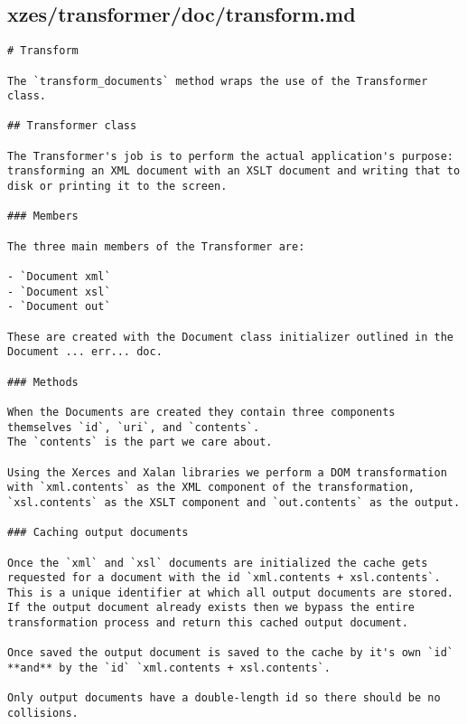 \subsection{xzes/transformer/doc/transform.md}
\begin{lstlisting}[caption={Documentation about the transformation code.}]
# Transform

The `transform_documents` method wraps the use of the Transformer class.

## Transformer class

The Transformer's job is to perform the actual application's purpose: transforming an XML document with an XSLT document and writing that to disk or printing it to the screen.

### Members

The three main members of the Transformer are:

- `Document xml`
- `Document xsl`
- `Document out`

These are created with the Document class initializer outlined in the Document ... err... doc.

### Methods

When the Documents are created they contain three components themselves `id`, `uri`, and `contents`.
The `contents` is the part we care about.

Using the Xerces and Xalan libraries we perform a DOM transformation with `xml.contents` as the XML component of the transformation, `xsl.contents` as the XSLT component and `out.contents` as the output.

### Caching output documents

Once the `xml` and `xsl` documents are initialized the cache gets requested for a document with the id `xml.contents + xsl.contents`.
This is a unique identifier at which all output documents are stored.
If the output document already exists then we bypass the entire transformation process and return this cached output document.

Once saved the output document is saved to the cache by it's own `id` **and** by the `id` `xml.contents + xsl.contents`.

Only output documents have a double-length id so there should be no collisions.
\end{lstlisting}
